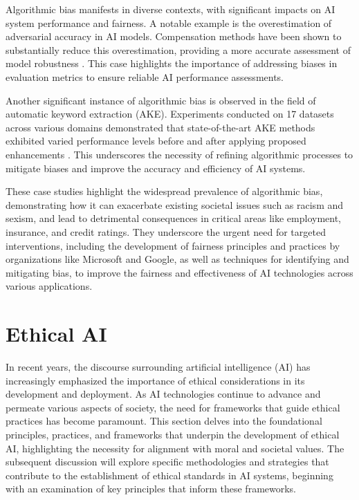 Algorithmic bias manifests in diverse contexts, with significant impacts on AI system performance and fairness. A notable example is the overestimation of adversarial accuracy in AI models. Compensation methods have been shown to substantially reduce this overestimation, providing a more accurate assessment of model robustness \cite{lee2020rethinkingempiricalevaluationadversarial}. This case highlights the importance of addressing biases in evaluation metrics to ensure reliable AI performance assessments.



Another significant instance of algorithmic bias is observed in the field of automatic keyword extraction (AKE). Experiments conducted on 17 datasets across various domains demonstrated that state-of-the-art AKE methods exhibited varied performance levels before and after applying proposed enhancements \cite{altuncu2022improvingperformanceautomatickeyword}. This underscores the necessity of refining algorithmic processes to mitigate biases and improve the accuracy and efficiency of AI systems.



These case studies highlight the widespread prevalence of algorithmic bias, demonstrating how it can exacerbate existing societal issues such as racism and sexism, and lead to detrimental consequences in critical areas like employment, insurance, and credit ratings. They underscore the urgent need for targeted interventions, including the development of fairness principles and practices by organizations like Microsoft and Google, as well as techniques for identifying and mitigating bias, to improve the fairness and effectiveness of AI technologies across various applications. \cite{magee2021intersectionalbiascausallanguage}













\section{Ethical AI} \label{sec:Ethical AI}

In recent years, the discourse surrounding artificial intelligence (AI) has increasingly emphasized the importance of ethical considerations in its development and deployment. As AI technologies continue to advance and permeate various aspects of society, the need for frameworks that guide ethical practices has become paramount. This section delves into the foundational principles, practices, and frameworks that underpin the development of ethical AI, highlighting the necessity for alignment with moral and societal values. The subsequent discussion will explore specific methodologies and strategies that contribute to the establishment of ethical standards in AI systems, beginning with an examination of key principles that inform these frameworks.





